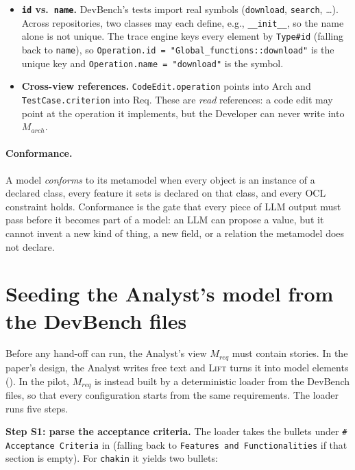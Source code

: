 \documentclass[10pt,a4paper]{article}
\newcommand{\cls}[1]{\textsf{#1}}
\newcommand{\code}[1]{\texttt{#1}}
\theoremstyle{definition}
\newcommand{\what}[1]{\par\smallskip\noindent\textbf{#1}\quad}
\begin{document}
\begin{itemize}[nosep]
\item \textbf{\code{id} vs.\ \code{name}.} DevBench's tests import real
symbols (\code{download}, \code{search}, \ldots). Across repositories,
two classes may each define, e.g., \code{__init__}, so the name alone is not
unique. The trace engine keys every element by \code{Type\#id} (falling back to
\code{name}), so \code{Operation.id = "Global_functions::download"} is the
unique key and \code{Operation.name = "download"} is the symbol.
\item \textbf{Cross-view references.} \code{CodeEdit.operation} points into
\cls{Arch} and \code{TestCase.criterion} into \cls{Req}. These are
\emph{read} references: a code edit may point at the operation it implements,
but the Developer can never write into $M_{\mathit{arch}}$.
\end{itemize}

\paragraph{Conformance.} A model \emph{conforms} to its metamodel when every
object is an instance of a declared class, every feature it sets is declared
on that class, and every OCL constraint holds. Conformance is the gate that
every piece of LLM output must pass before it becomes part of a model: an
LLM can propose a value, but it cannot invent a new kind of thing, a new
field, or a relation the metamodel does not declare.

\section{Seeding the Analyst's model from the DevBench files}\label{sec:seed}

Before any hand-off can run, the Analyst's view $M_{\mathit{req}}$ must
contain stories. In the paper's design, the Analyst writes free text and
\textsc{Lift} turns it into model elements (). In the pilot,
$M_{\mathit{req}}$ is instead built by a deterministic loader from the
DevBench files, so that every configuration starts from the same
requirements. The loader runs five steps.

\what{Step S1: parse the acceptance criteria.} The loader takes the bullets
under \code{\# Acceptance Criteria} in  (falling back to
\code{Features and Functionalities} if that section is empty). For
\texttt{chakin} it yields two bullets:
\end{document}
